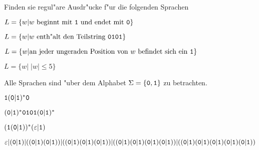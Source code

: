 Finden sie regul"are Ausdr"ucke f"ur die folgenden Sprachen
\begin{teilaufgaben}
\item $L=\{w|\text{$w$ beginnt mit {\tt 1} und endet mit {\tt 0}}\}$
\item $L=\{w|\text{$w$ enth"alt den Teilstring {\tt 0101}}\}$
\item $L=\{w|\text{an jeder ungeraden Position von $w$ befindet sich ein {\tt 1}}\}$
\item $L=\{w|\;|w|\le 5\}$
\end{teilaufgaben}
Alle Sprachen sind "uber dem Alphabet $\Sigma=\{{\tt 0},{\tt 1}\}$ zu
betrachten.

\begin{loesung}
\begin{teilaufgaben}
\item ${\tt 1}({\tt 0}|{\tt 1})^*{\tt 0}$
\item $({\tt 0}|{\tt 1})^* {\tt 0101} ({\tt 0}|{\tt 1})^*$
\item $({\tt 1}({\tt 0}|{\tt 1}))^*(\varepsilon|{\tt 1})$
\item $
\varepsilon|
({\tt 0}|{\tt 1})|
(({\tt 0}|{\tt 1}) ({\tt 0}|{\tt 1}))|
(({\tt 0}|{\tt 1}) ({\tt 0}|{\tt 1}) ({\tt 0}|{\tt 1}))|
(({\tt 0}|{\tt 1}) ({\tt 0}|{\tt 1}) ({\tt 0}|{\tt 1}) ({\tt 0}|{\tt 1}))|
(({\tt 0}|{\tt 1}) ({\tt 0}|{\tt 1}) ({\tt 0}|{\tt 1}) ({\tt 0}|{\tt 1}) ({\tt 0}|{\tt 1}))$
\end{teilaufgaben}
\end{loesung}
